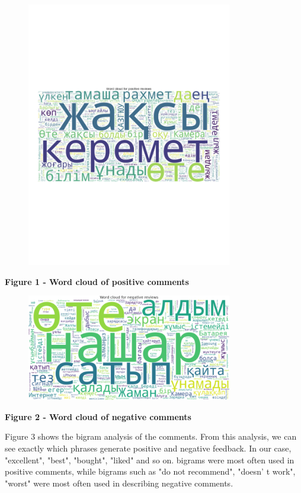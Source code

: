 \begin{figure}[H]
	\centering
	\includegraphics[width=0.8\textwidth]{media/ict/image9}
	\caption*{}
\end{figure}


{\bfseries Figure 1 - Word cloud of positive comments}

\begin{figure}[H]
	\centering
	\includegraphics[width=0.8\textwidth]{media/ict/image10}
	\caption*{}
\end{figure}


{\bfseries Figure 2 - Word cloud of negative comments}

Figure 3 shows the bigram analysis of the comments. From this analysis,
we can see exactly which phrases generate positive and negative
feedback. In our case, "excellent", "best", "bought", "liked" and so on.
bigrams were most often used in positive comments, while bigrams such as
"do not recommend", "doesn' t work", "worst" were most
often used in describing negative comments.

